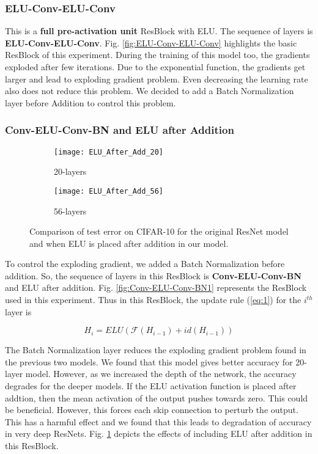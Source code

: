 \documentclass[10pt,twocolumn,letterpaper]{article}
\begin{document}
\subsubsection{ELU-Conv-ELU-Conv}

This is a \textbf{full pre-activation unit} ResBlock \cite{[32]} with ELU. The sequence of layers is \textbf{ELU-Conv-ELU-Conv}. Fig. \ref{fig:ELU-Conv-ELU-Conv} highlights the basic ResBlock of this experiment. During the training of this model too, the gradients exploded after few iterations. Due to the exponential function, the gradients get larger and lead to exploding gradient problem. Even decreasing the learning rate also does not reduce this problem. We decided to add a Batch Normalization layer before Addition to control this problem.

\subsubsection{Conv-ELU-Conv-BN and ELU after Addition}

\begin{figure}
    \centering
    \begin{subfigure}{.23\textwidth}
        \centering
        \texttt{[image: ELU\_After\_Add\_20]}
        \caption{20-layers}
    \end{subfigure}
    \begin{subfigure}{.23\textwidth}
        \centering
        \texttt{[image: ELU\_After\_Add\_56]}
        \caption{56-layers}
    \end{subfigure}
    \caption{Comparison of test error on CIFAR-10 for the original ResNet model and when ELU is placed after addition in our model.}
    \label{fig:ELU_After_Add}
\end{figure}

To control the exploding gradient, we added a Batch Normalization before addition. So, the sequence of layers in this ResBlock is \textbf{Conv-ELU-Conv-BN} and ELU after addition. Fig. \ref{fig:Conv-ELU-Conv-BN1} represents the ResBlock used in this experiment. Thus in this ResBlock, the update rule (\ref{eq:1}) for the \(i^{th}\) layer is

\begin{equation} \label{eq:elu_after_add}
 H_i = ELU( \mathcal{F}(H_{i-1}) + id(H_{i-1} ))
\end{equation}

The Batch Normalization layer reduces the exploding gradient problem found in the previous two models. We found that this model gives better accuracy for 20-layer model. However, as we increased the depth of the network, the accuracy degrades for the deeper models. If the ELU activation function is placed after addtion, then the mean activation of the output pushes towards zero. This could be beneficial. However, this forces each skip connection to perturb the output. This has a harmful effect and we found that this leads to degradation of accuracy in very deep ResNets. Fig. \ref{fig:ELU_After_Add} depicts the effects of including ELU after addition in this ResBlock.
\end{document}
